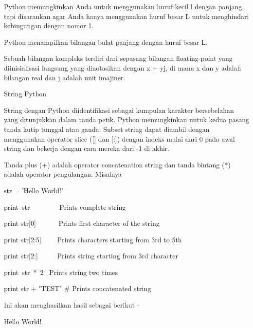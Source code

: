 \noindent 
Python memungkinkan Anda untuk menggunakan huruf kecil l dengan panjang, tapi disarankan agar Anda hanya menggunakan huruf besar L untuk menghindari kebingungan dengan nomor 1.  \par
\noindent 
Python menampilkan bilangan bulat panjang dengan huruf besar L. \par
\vspace{12pt}
\noindent 
Sebuah bilangan kompleks terdiri dari sepasang bilangan floating-point yang diinisialisasi langsung yang dinotasikan dengan x + yj, di mana x dan y adalah bilangan real dan j adalah unit imajiner. \par
\vspace{12pt}
\noindent 
String Python \par
\vspace{12pt}
\noindent 
String dengan Python diidentifikasi sebagai kumpulan karakter bersebelahan yang ditunjukkan dalam tanda petik. $  $Python memungkinkan untuk kedua pasang tanda kutip tunggal atau ganda. $  $Subset string dapat diambil dengan menggunakan operator slice ([] dan [:]) dengan indeks mulai dari 0 pada awal string dan bekerja dengan cara mereka dari -1 di akhir. \par
\vspace{12pt}
\noindent 
Tanda plus (+) adalah operator concatenation string dan tanda bintang (*) adalah operator pengulangan. $  $Misalnya  \par
\vspace{12pt}
\vspace{12pt}
\noindent 
str = 'Hello World!' \par
\vspace{12pt}
\noindent 
print~str~~~~~~~~  Prints complete string \par
\noindent 
print str[0]~~~~~~  Prints first character of the string \par
\noindent 
print str[2:5]~~~~  Prints characters starting from 3rd to 5th \par
\noindent 
print str[2:]~~~~~  Prints string starting from 3rd character \par
\noindent 
print~str~*~2~     Prints string two times \par
\noindent 
print str + "TEST"  $  \#  $ Prints concatenated string \par
\vspace{12pt}
\noindent 
Ini akan menghasilkan hasil sebagai berikut - \par
\vspace{12pt}
\noindent 
Hello World! \par
